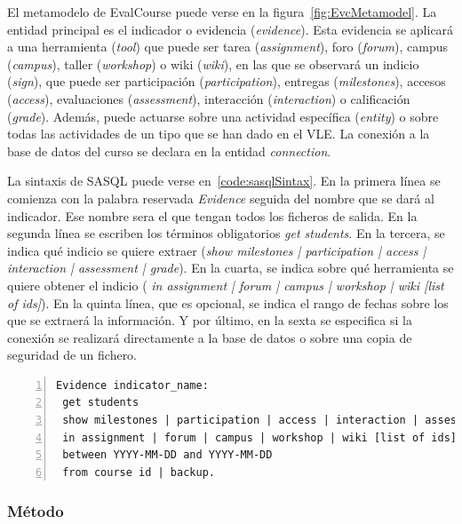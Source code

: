 El metamodelo de EvalCourse puede verse en la figura~\ref{fig:EvcMetamodel}. La entidad principal es el indicador o evidencia (\emph{evidence}). Esta evidencia se aplicará a una herramienta (\emph{tool}) que puede ser tarea (\emph{assignment}), foro (\emph{forum}), campus (\emph{campus}), taller (\emph{workshop}) o wiki (\emph{wiki}), en las que se observará un indicio (\emph{sign}), que puede ser participación (\emph{participation}), entregas (\emph{milestones}), accesos (\emph{access}), evaluaciones (\emph{assessment}), interacción (\emph{interaction}) o calificación (\emph{grade}). Además, puede actuarse sobre una actividad específica (\emph{entity}) o sobre todas las actividades de un tipo que se han dado en el VLE. La conexión a la base de datos del curso se declara en la entidad \emph{connection}. 

La sintaxis de SASQL puede verse en~\ref{code:sasqlSintax}. En la primera línea se comienza con la palabra reservada \emph{Evidence} seguida del nombre que se dará al indicador. Ese nombre sera el que tengan todos los ficheros de salida. En la segunda línea se escriben los términos obligatorios \emph{get students}. En la tercera, se indica qué indicio se quiere extraer (\emph{show milestones | participation | access | interaction | assessment | grade}). En la cuarta, se indica sobre qué herramienta se quiere obtener el indicio (\emph{ in assignment | forum | campus | workshop | wiki [list of ids]}). En la quinta línea, que es opcional, se indica el rango de fechas sobre los que se extraerá la información. Y por último, en la sexta se especifica si la conexión se realizará directamente a la base de datos o sobre una copia de seguridad de un fichero.

\begin{lstlisting}[caption=Sintaxis de SASQL (las palabras reservadas se muestran resaltadas),label=code:sasqlSintax,numbers=left, captionpos=b, morekeywords={Evidence,get, students, show, milestones, participation, access, in, assignment, forum, campus, wiki, between, and, workshop, interaction, assessment, grade, from, course, backup}]
Evidence indicator_name:
 get students 
 show milestones | participation | access | interaction | assessment | grade
 in assignment | forum | campus | workshop | wiki [list of ids]
 between YYYY-MM-DD and YYYY-MM-DD
 from course id | backup.
\end{lstlisting}

\subsubsection{Método}

